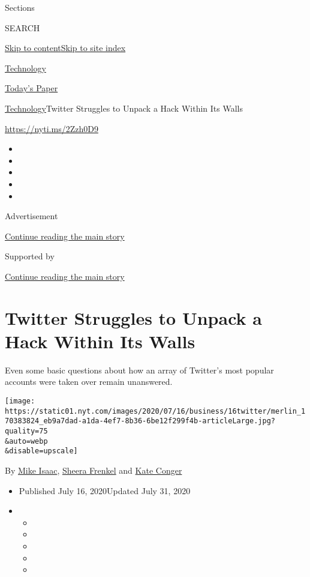 Sections

SEARCH

\protect\hyperlink{site-content}{Skip to
content}\protect\hyperlink{site-index}{Skip to site index}

\href{https://www.nytimes.com/section/technology}{Technology}

\href{https://myaccount.nytimes.com/auth/login?response_type=cookie\&client_id=vi}{}

\href{https://www.nytimes.com/section/todayspaper}{Today's Paper}

\href{/section/technology}{Technology}\textbar{}Twitter Struggles to
Unpack a Hack Within Its Walls

\url{https://nyti.ms/2Zzh0D9}

\begin{itemize}
\item
\item
\item
\item
\item
\end{itemize}

Advertisement

\protect\hyperlink{after-top}{Continue reading the main story}

Supported by

\protect\hyperlink{after-sponsor}{Continue reading the main story}

\hypertarget{twitter-struggles-to-unpack-a-hack-within-its-walls}{%
\section{Twitter Struggles to Unpack a Hack Within Its
Walls}\label{twitter-struggles-to-unpack-a-hack-within-its-walls}}

Even some basic questions about how an array of Twitter's most popular
accounts were taken over remain unanswered.

\texttt{[image: https://static01.nyt.com/images/2020/07/16/business/16twitter/merlin\_170383824\_eb9a7dad-a1da-4ef7-8b36-6be12f299f4b-articleLarge.jpg?quality=75\\\&auto=webp\\\&disable=upscale]}

By \href{https://www.nytimes.com/by/mike-isaac}{Mike Isaac},
\href{https://www.nytimes.com/by/sheera-frenkel}{Sheera Frenkel} and
\href{https://www.nytimes.com/by/kate-conger}{Kate Conger}

\begin{itemize}
\item
  Published July 16, 2020Updated July 31, 2020
\item
  \begin{itemize}
  \item
  \item
  \item
  \item
  \item
  \end{itemize}
\end{itemize}

